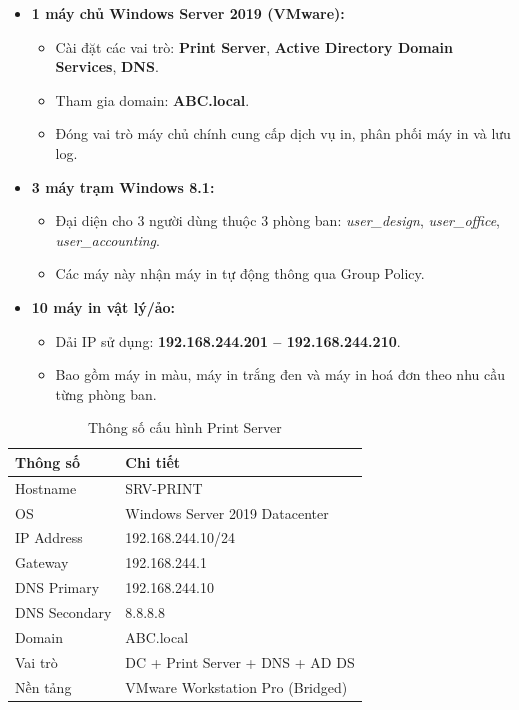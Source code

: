 \begin{itemize}[leftmargin=*,noitemsep,topsep=3pt]
    \item \textbf{1 máy chủ Windows Server 2019 (VMware):}
    \begin{itemize}[noitemsep]
        \item Cài đặt các vai trò: \textbf{Print Server}, \textbf{Active Directory Domain Services}, \textbf{DNS}.
        \item Tham gia domain: \textbf{ABC.local}.
        \item Đóng vai trò máy chủ chính cung cấp dịch vụ in, phân phối máy in và lưu log.
    \end{itemize}

    \item \textbf{3 máy trạm Windows 8.1:}
    \begin{itemize}[noitemsep]
        \item Đại diện cho 3 người dùng thuộc 3 phòng ban: \textit{user\_design}, \textit{user\_office}, \textit{user\_accounting}.
        \item Các máy này nhận máy in tự động thông qua Group Policy.
    \end{itemize}

    \item \textbf{10 máy in vật lý/ảo:}
    \begin{itemize}[noitemsep]
        \item Dải IP sử dụng: \textbf{192.168.244.201 – 192.168.244.210}.
        \item Bao gồm máy in màu, máy in trắng đen và máy in hoá đơn theo nhu cầu từng phòng ban.
    \end{itemize}
\end{itemize}

\begin{table}[htbp]
\centering
\small
\begin{tabular}{|l|p{10.5cm}|}
\hline
\textbf{Thông số} & \textbf{Chi tiết} \\
\hline
Hostname & SRV-PRINT \\
\hline
OS & Windows Server 2019 Datacenter \\
\hline
IP Address & 192.168.244.10/24 \\
\hline
Gateway & 192.168.244.1 \\
\hline
DNS Primary & 192.168.244.10 \\
\hline
DNS Secondary & 8.8.8.8 \\
\hline
Domain & ABC.local \\
\hline
Vai trò & DC + Print Server + DNS + AD DS \\
\hline
Nền tảng & VMware Workstation Pro (Bridged) \\
\hline
\end{tabular}
\caption{Thông số cấu hình Print Server}
\label{tab:print_server_config}
\end{table}

